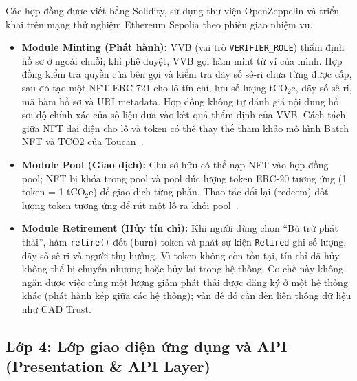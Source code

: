 Các hợp đồng được viết bằng Solidity, sử dụng thư viện OpenZeppelin và triển khai trên mạng thử nghiệm Ethereum Sepolia theo phiếu giao nhiệm vụ.
\begin{itemize}
    \item \textbf{Module Minting (Phát hành):} VVB (vai trò \texttt{VERIFIER\_ROLE}) thẩm định hồ sơ ở ngoài chuỗi; khi phê duyệt, VVB gọi hàm mint từ ví của mình. Hợp đồng kiểm tra quyền của bên gọi và kiểm tra dãy số sê-ri chưa từng được cấp, sau đó tạo một NFT ERC-721 cho lô tín chỉ, lưu số lượng tCO$_2$e, dãy số sê-ri, mã băm hồ sơ và URI metadata. Hợp đồng không tự đánh giá nội dung hồ sơ; độ chính xác của số liệu dựa vào kết quả thẩm định của VVB. Cách tách giữa NFT đại diện cho lô và token có thể thay thế tham khảo mô hình Batch NFT và TCO2 của Toucan~\cite{toucan2025docs}.
    \item \textbf{Module Pool (Giao dịch):} Chủ sở hữu có thể nạp NFT vào hợp đồng pool; NFT bị khóa trong pool và pool đúc lượng token ERC-20 tương ứng (1 token = 1 tCO$_2$e) để giao dịch từng phần. Thao tác đổi lại (redeem) đốt lượng token tương ứng để rút một lô ra khỏi pool~\cite{toucan2025docs}.
    \item \textbf{Module Retirement (Hủy tín chỉ):} Khi người dùng chọn ``Bù trừ phát thải'', hàm \texttt{retire()} đốt (burn) token và phát sự kiện \texttt{Retired} ghi số lượng, dãy số sê-ri và người thụ hưởng. Vì token không còn tồn tại, tín chỉ đã hủy không thể bị chuyển nhượng hoặc hủy lại trong hệ thống. Cơ chế này không ngăn được việc cùng một lượng giảm phát thải được đăng ký ở một hệ thống khác (phát hành kép giữa các hệ thống); vấn đề đó cần đến liên thông dữ liệu như CAD Trust.
\end{itemize}

\subsection*{Lớp 4: Lớp giao diện ứng dụng và API (Presentation \& API Layer)}
\label{subsec:lop4}

